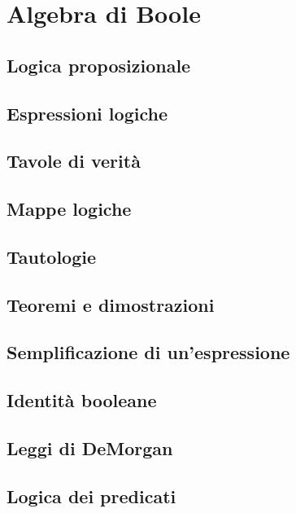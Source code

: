 \section{Algebra di Boole}
\subsection{Logica proposizionale}
\subsection{Espressioni logiche}
\subsection{Tavole di verità}
\subsection{Mappe logiche}
\subsection{Tautologie}
\subsection{Teoremi e dimostrazioni}
\subsection{Semplificazione di un'espressione}
\subsection{Identità booleane}
\subsection{Leggi di DeMorgan}
\subsection{Logica dei predicati}
